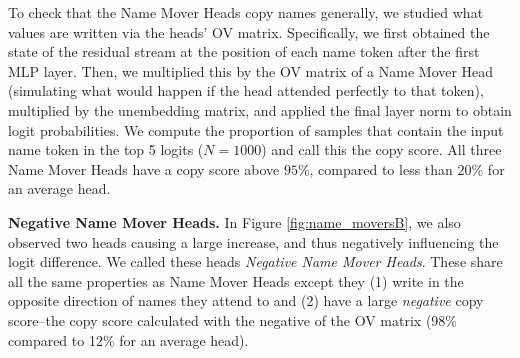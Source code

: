 To check that the Name Mover Heads copy names generally, we studied what values are written via the heads' OV matrix. Specifically, we first obtained the state of the residual stream at the position of each name token after the first MLP layer. Then, we multiplied this by the OV matrix of a Name Mover Head (simulating what would happen if the head attended perfectly to that token), multiplied by the unembedding matrix, and applied the final layer norm to obtain logit probabilities. We compute the proportion of samples that contain the input name token in the top 5 logits ($N = 1000$) and call this the copy score. All three Name Mover Heads have a copy score above $95\%$, compared to less than $20\%$ for an average head.


\textbf{Negative Name Mover Heads.}
In Figure \ref{fig:name_moversB}, we also observed two heads causing a large increase, and thus negatively influencing the logit difference. We called these heads \emph{Negative Name Mover Heads}. These share all the same properties as Name Mover Heads except they (1) write in the opposite direction of names they attend to and (2) have a large \textit{negative} copy score--the copy score calculated with the negative of the OV matrix (98\% compared to 12\% for an average head).  %


